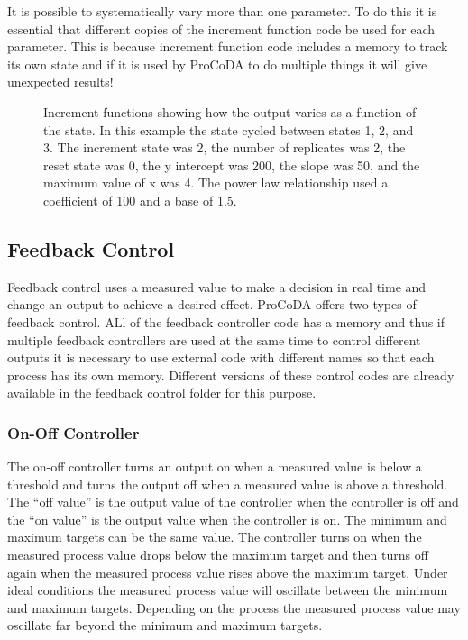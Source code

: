 \documentclass[letterpaper,10pt,english]{sphinxmanual}
\let\sphinxpxdimen\pdfpxdimen\else\newdimen\sphinxpxdimen
\begin{document}
It is possible to systematically vary more than one parameter. To do this it is essential that different copies of the increment function code be used for each parameter. This is because increment function code includes a memory to track its own state and if it is used by ProCoDA to do multiple things it will give unexpected results!

\begin{figure}[htbp]
\centering
\capstart

\noindent\sphinxincludegraphics[width=600\sphinxpxdimen]{{increment_functions}.png}
\caption{Increment functions showing how the output varies as a function of the state. In this example the state cycled between states 1, 2, and 3. The increment state was 2, the number of replicates was 2, the reset state was 0, the y intercept was 200, the slope was 50, and the maximum value of x was 4. The power law relationship used a coefficient of 100 and a base of 1.5.}\label{\detokenize{ProCoDA/ProCoDA:id16}}\label{\detokenize{ProCoDA/ProCoDA:figure-increment-functions}}\end{figure}


\subsection{Feedback Control}
\label{\detokenize{ProCoDA/ProCoDA:feedback-control}}\label{\detokenize{ProCoDA/ProCoDA:id4}}
Feedback control uses a measured value to make a decision in real time and change an output to achieve a desired effect. ProCoDA offers two types of feedback control. ALl of the feedback controller code has a memory and thus if multiple feedback controllers are used at the same time to control different outputs it is necessary to use external code with different names so that each process has its own memory. Different versions of these control codes are already available in the feedback control folder for this purpose.


\subsubsection{On-Off Controller}
\label{\detokenize{ProCoDA/ProCoDA:on-off-controller}}\label{\detokenize{ProCoDA/ProCoDA:id5}}
The on-off controller turns an output on when a measured value is below a threshold and turns the output off when a measured value is above a threshold.
The “off value” is the output value of the controller when the controller is off and the “on value” is the output value when the controller is on. The minimum and maximum targets can be the same value. The controller turns on when the measured process value drops below the maximum target and then turns off again when the measured process value rises above the maximum target. Under ideal conditions the measured process value will oscillate between the minimum and maximum targets. Depending on the process the measured process value may oscillate far beyond the minimum and maximum targets.
\end{document}
